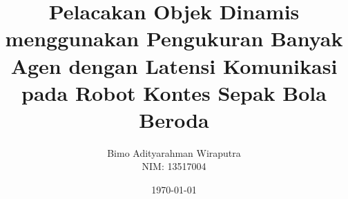 \documentclass[12pt, a4paper, onecolumn, oneside, final]{report}
\begin{document}
\title{Pelacakan Objek Dinamis menggunakan Pengukuran Banyak Agen dengan Latensi Komunikasi pada Robot Kontes Sepak Bola Beroda}
\date{\today}
\author{
    Bimo Adityarahman Wiraputra \\
    NIM: 13517004
}

\setcounter{page}{0}





\pagestyle{plain}




\renewcommand*\contentsname{DAFTAR ISI}
\renewcommand*\listfigurename{DAFTAR GAMBAR}
\renewcommand*\listtablename{DAFTAR TABEL}
\renewcommand*\bibname{DAFTAR PUSTAKA}

\tableofcontents
{%
    \let\oldnumberline\numberline%
    \renewcommand{\numberline}{\figurename~\oldnumberline}%
    \listoffigures%
}
{%
    \let\oldnumberline\numberline%
    \renewcommand{\numberline}{\tablename~\oldnumberline}%
    \listoftables%
}


\renewcommand{\chaptername}{BAB}
\renewcommand{\thechapter}{\Roman{chapter}}







\begingroup
\renewcommand{\baselinestretch}{1.0}
\printbibliography[heading=bibintoc]
\endgroup


%     
%     
\end{document}
